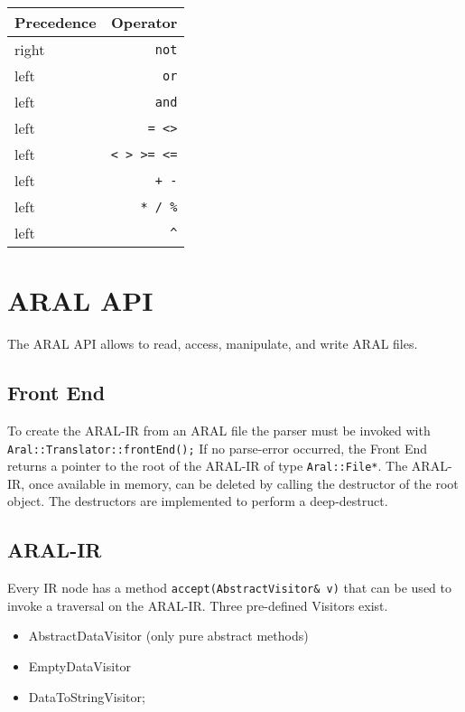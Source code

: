 \vspace{0.3cm}
\begin{tabular}{|l|r|}\hline
Precedence & Operator\\\hline\hline
right & \texttt{not}\\\hline
left & \texttt{or}\\\hline
left & \texttt{and}\\\hline
left & \texttt{= <>}\\\hline
left & \texttt{< > >= <=} \\\hline
left & \texttt{+ -}\\\hline
left & \texttt{* / \%}\\\hline
left & \texttt{\^}\\\hline
\end{tabular}


\chapter{ARAL API}

The ARAL API allows to read, access, manipulate, and write ARAL files.

\section{Front End}

To create the ARAL-IR from an ARAL file the parser must be invoked
with \verb+Aral::Translator::frontEnd();+
If no parse-error occurred, the Front End returns a pointer to the
root of the ARAL-IR of type \verb+Aral::File*+.
The ARAL-IR, once available in memory, can be deleted by calling
the destructor of the root object. The destructors are implemented to
perform a deep-destruct.

\section{ARAL-IR}
Every IR node has a method \verb+accept(AbstractVisitor& v)+ that can be used
to invoke a traversal on the ARAL-IR. Three pre-defined Visitors exist.
\begin{itemize}
\item AbstractDataVisitor (only pure abstract methods)
\item EmptyDataVisitor
\item DataToStringVisitor;
\end{itemize}

